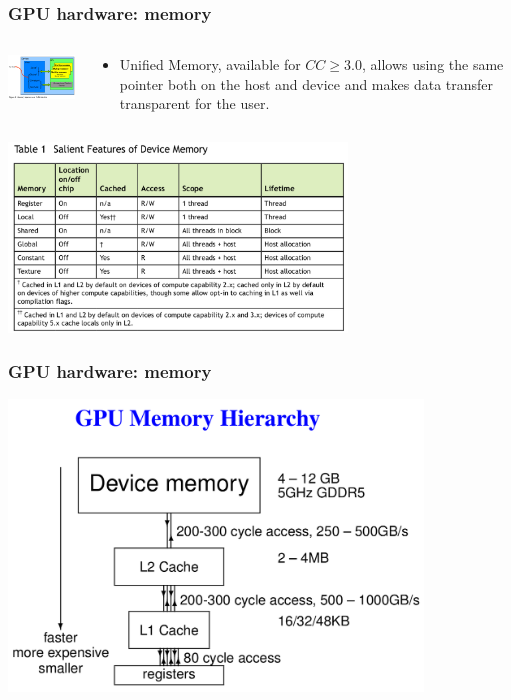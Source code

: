\begin{frame}[fragile]
  \frametitle{GPU hardware: memory}
\begin{columns}
\begin{column}{0.5\textwidth}
\includegraphics[width=4.0cm]{graphs/memory2.png}
\end{column}

\begin{column}{0.5\textwidth}
\begin{itemize}
\item {\color{mycolordef}Unified Memory}, available for $CC \ge 3.0$,  allows using the same pointer both on the host and device and makes data transfer transparent for the user. 
\end{itemize}
\end{column}

\end{columns}
\includegraphics[width=9.0cm]{graphs/memory3.png}
\end{frame}


\begin{frame}[fragile]
  \frametitle{GPU hardware: memory}
\includegraphics[width=11.0cm]{graphs/memory5.png}
\end{frame}

